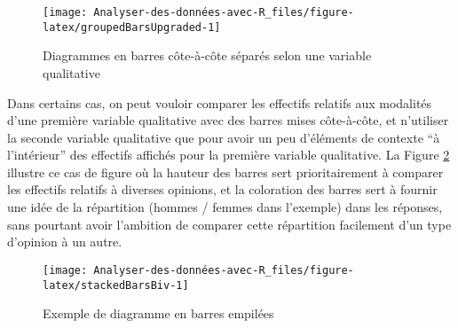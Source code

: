 \documentclass[
  french,
]{book}
\newenvironment{Shaded}{\begin{snugshade}}{\end{snugshade}}
\newcommand{\DataTypeTok}[1]{\textcolor[rgb]{0.13,0.29,0.53}{#1}}
\newcommand{\DecValTok}[1]{\textcolor[rgb]{0.00,0.00,0.81}{#1}}
\newcommand{\FloatTok}[1]{\textcolor[rgb]{0.00,0.00,0.81}{#1}}
\newcommand{\KeywordTok}[1]{\textcolor[rgb]{0.13,0.29,0.53}{\textbf{#1}}}
\newcommand{\NormalTok}[1]{#1}
\newcommand{\OperatorTok}[1]{\textcolor[rgb]{0.81,0.36,0.00}{\textbf{#1}}}
\newcommand{\StringTok}[1]{\textcolor[rgb]{0.31,0.60,0.02}{#1}}
\begin{document}
\begin{figure}

{\centering \texttt{[image: Analyser-des-données-avec-R\_files/figure-latex/groupedBarsUpgraded-1]} 

}

\caption{Diagrammes en barres côte-à-côte séparés selon une variable qualitative}\label{fig:groupedBarsUpgraded}
\end{figure}

Dans certains cas, on peut vouloir comparer les effectifs relatifs aux modalités d'une première variable qualitative avec des barres mises côte-à-côte, et n'utiliser la seconde variable qualitative que pour avoir un peu d'éléments de contexte \enquote{à l'intérieur} des effectifs affichés pour la première variable qualitative. La Figure \ref{fig:stackedBarsBiv} illustre ce cas de figure où la hauteur des barres sert prioritairement à comparer les effectifs relatifs à diverses opinions, et la coloration des barres sert à fournir une idée de la répartition (hommes / femmes dans l'exemple) dans les réponses, sans pourtant avoir l'ambition de comparer cette répartition facilement d'un type d'opinion à un autre.

\begin{Shaded}
\end{Shaded}

\begin{figure}

{\centering \texttt{[image: Analyser-des-données-avec-R\_files/figure-latex/stackedBarsBiv-1]} 

}

\caption{Exemple de diagramme en barres empilées}\label{fig:stackedBarsBiv}
\end{figure}
\end{document}
